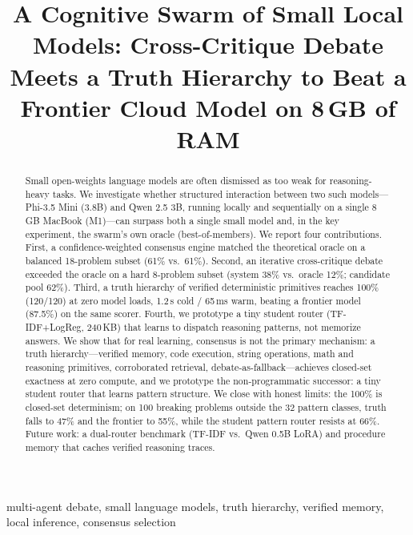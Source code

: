 \documentclass[conference,compsoc]{IEEEtran}
\begin{document}
\title{A Cognitive Swarm of Small Local Models: Cross-Critique Debate Meets a Truth Hierarchy to Beat a Frontier Cloud Model on 8\,GB of RAM}

\author{
}

\maketitle

\begin{abstract}
Small open-weights language models are often dismissed as too weak for reasoning-heavy tasks. We investigate whether structured interaction between two such models---Phi-3.5 Mini (3.8B) and Qwen 2.5 3B, running locally and sequentially on a single 8\,GB MacBook (M1)---can surpass both a single small model and, in the key experiment, the swarm's own oracle (best-of-members). We report four contributions. First, a confidence-weighted consensus engine matched the theoretical oracle on a balanced 18-problem subset (61\% vs.\ 61\%). Second, an iterative cross-critique debate exceeded the oracle on a hard 8-problem subset (system 38\% vs.\ oracle 12\%; candidate pool 62\%). Third, a truth hierarchy of verified deterministic primitives reaches 100\% (120/120) at zero model loads, 1.2\,s cold / 65\,ms warm, beating a frontier model (87.5\%) on the same scorer. Fourth, we prototype a tiny student router (TF-IDF+LogReg, 240\,KB) that learns to dispatch reasoning patterns, not memorize answers. We show that for real learning, consensus is not the primary mechanism: a truth hierarchy---verified memory, code execution, string operations, math and reasoning primitives, corroborated retrieval, debate-as-fallback---achieves closed-set exactness at zero compute, and we prototype the non-programmatic successor: a tiny student router that learns pattern structure. We close with honest limits: the 100\% is closed-set determinism; on 100 breaking problems outside the 32 pattern classes, truth falls to 47\% and the frontier to 55\%, while the student pattern router resists at 66\%. Future work: a dual-router benchmark (TF-IDF vs.\ Qwen 0.5B LoRA) and procedure memory that caches verified reasoning traces.
\end{abstract}

\begin{IEEEkeywords}
multi-agent debate, small language models, truth hierarchy, verified memory, local inference, consensus selection
\end{IEEEkeywords}
\end{document}
